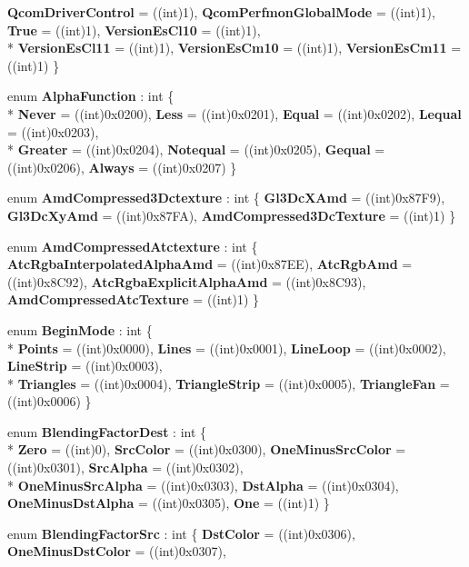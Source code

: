 \begin{DoxyCompactItemize}
{\bfseries Qcom\-Driver\-Control} = ((int)1), 
{\bfseries Qcom\-Perfmon\-Global\-Mode} = ((int)1), 
{\bfseries True} = ((int)1), 
{\bfseries Version\-Es\-Cl10} = ((int)1), 
\\*
{\bfseries Version\-Es\-Cl11} = ((int)1), 
{\bfseries Version\-Es\-Cm10} = ((int)1), 
{\bfseries Version\-Es\-Cm11} = ((int)1)
 \}
\item 
enum {\bfseries Alpha\-Function} \-: int \{ \\*
{\bfseries Never} = ((int)0x0200), 
{\bfseries Less} = ((int)0x0201), 
{\bfseries Equal} = ((int)0x0202), 
{\bfseries Lequal} = ((int)0x0203), 
\\*
{\bfseries Greater} = ((int)0x0204), 
{\bfseries Notequal} = ((int)0x0205), 
{\bfseries Gequal} = ((int)0x0206), 
{\bfseries Always} = ((int)0x0207)
 \}
\item 
enum {\bfseries Amd\-Compressed3\-Dctexture} \-: int \{ {\bfseries Gl3\-Dc\-X\-Amd} = ((int)0x87\-F9), 
{\bfseries Gl3\-Dc\-Xy\-Amd} = ((int)0x87\-F\-A), 
{\bfseries Amd\-Compressed3\-Dc\-Texture} = ((int)1)
 \}
\item 
enum {\bfseries Amd\-Compressed\-Atctexture} \-: int \{ {\bfseries Atc\-Rgba\-Interpolated\-Alpha\-Amd} = ((int)0x87\-E\-E), 
{\bfseries Atc\-Rgb\-Amd} = ((int)0x8\-C92), 
{\bfseries Atc\-Rgba\-Explicit\-Alpha\-Amd} = ((int)0x8\-C93), 
{\bfseries Amd\-Compressed\-Atc\-Texture} = ((int)1)
 \}
\item 
enum {\bfseries Begin\-Mode} \-: int \{ \\*
{\bfseries Points} = ((int)0x0000), 
{\bfseries Lines} = ((int)0x0001), 
{\bfseries Line\-Loop} = ((int)0x0002), 
{\bfseries Line\-Strip} = ((int)0x0003), 
\\*
{\bfseries Triangles} = ((int)0x0004), 
{\bfseries Triangle\-Strip} = ((int)0x0005), 
{\bfseries Triangle\-Fan} = ((int)0x0006)
 \}
\item 
enum {\bfseries Blending\-Factor\-Dest} \-: int \{ \\*
{\bfseries Zero} = ((int)0), 
{\bfseries Src\-Color} = ((int)0x0300), 
{\bfseries One\-Minus\-Src\-Color} = ((int)0x0301), 
{\bfseries Src\-Alpha} = ((int)0x0302), 
\\*
{\bfseries One\-Minus\-Src\-Alpha} = ((int)0x0303), 
{\bfseries Dst\-Alpha} = ((int)0x0304), 
{\bfseries One\-Minus\-Dst\-Alpha} = ((int)0x0305), 
{\bfseries One} = ((int)1)
 \}
\item 
enum {\bfseries Blending\-Factor\-Src} \-: int \{ {\bfseries Dst\-Color} = ((int)0x0306), 
{\bfseries One\-Minus\-Dst\-Color} = ((int)0x0307), 

\end{DoxyCompactItemize}
